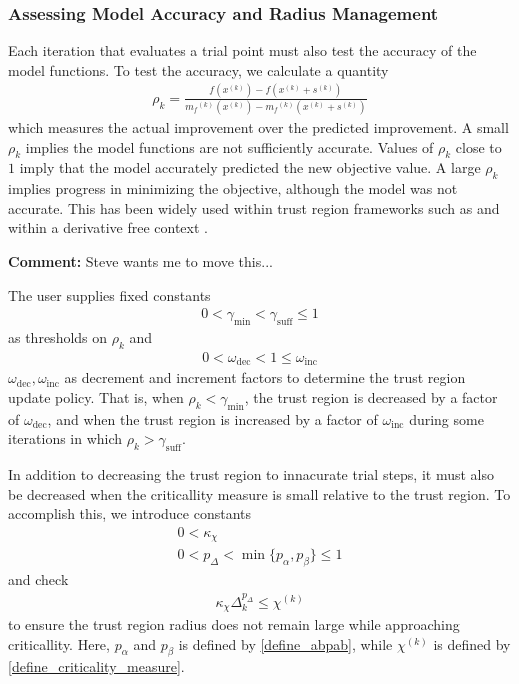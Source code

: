 \documentclass{article}
\newenvironment{comment}
  {\par\medskip
   \color{red}%
   \begin{framed}
   \textbf{Comment: }\ignorespaces}
 {\end{framed}
  \medskip}
\theoremstyle{case}
\numberwithin{theorem}{subsection}
\newcommand{\chik}{{\chi^{(k)}}}
\newcommand{\dk}{\Delta_k}
\newcommand{\gammabi}{\gamma_{\textrm{suff}}}
\newcommand{\gammasm}{\gamma_{\textrm{min}}}
\newcommand{\mfk}{{{m}_f}^{(k)}}
\newcommand{\omegadec}{\omega_{\text{dec}}}
\newcommand{\omegainc}{\omega_{\text{inc}}}
\newcommand{\rk}{\rho_k}
\newcommand{\sk}{{{s}^{(k)}}}
\newcommand{\xk}{x^{(k)}}
\begin{document}
\subsubsection{Assessing Model Accuracy and Radius Management}

Each iteration that evaluates a trial point must also test the accuracy of the model functions.
To test the accuracy, we calculate a quantity
\begin{align}
\label{define_rhok}
\rk = \frac{f(\xk) - f(\xk+\sk)}{\mfk(\xk) - \mfk(\xk+\sk)}
\end{align}
which measures the actual improvement over the predicted improvement.
A small $\rk$ implies the model functions are not sufficiently accurate.
Values of $\rk$ close to $1$ imply that the model accurately predicted the new objective value.
A large $\rk$ implies progress in minimizing the objective, although the model was not accurate.
This has been widely used within trust region frameworks such as \cite{Conn:2000:TM:357813} and within a derivative free context \cite{introduction_book}.

\begin{comment}
Steve wants me to move this...
\end{comment}
The user supplies fixed constants
\begin{align}
0 < \gammasm < \gammabi \le 1	\label{define_the_gammas}
\end{align}
as thresholds on $\rk$ and
\begin{align}
0 < \omegadec < 1 \le \omegainc		\label{define_the_omegas}
\end{align}
$\omegadec, \omegainc$ as decrement and increment factors to determine the trust region update policy.
That is, when $\rk < \gammasm$, the trust region is decreased by a factor of $\omegadec$, and when the trust region is increased by a factor of $\omegainc$
during some iterations in which $\rk > \gammabi$.

In addition to decreasing the trust region to innacurate trial steps, 
it must also be decreased when the criticallity measure is small relative to the trust region.
To accomplish this, we introduce constants
\begin{align}
0 < \kappa_{\chi} \label{define_kappa_chi} \\
0 < p_{\Delta} < \min\{p_{\alpha}, p_{\beta}\} \le 1 \label{define_p_delta} 
\end{align}
and check
\begin{align}
\kappa_{\chi} \dk^{p_{\Delta}} \le \chik \label{criticallity_check}
\end{align}
to ensure the trust region radius does not remain large while approaching criticallity.
Here,
$p_{\alpha}$ and $p_{\beta}$ is defined by \cref{define_abpab},
while $\chik$ is defined by \cref{define_criticality_measure}.
\end{document}
